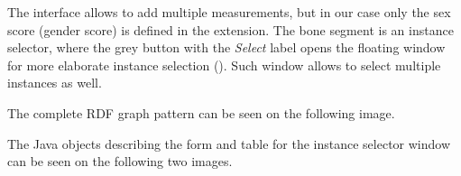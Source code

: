 
The interface allows to add multiple measurements, but in our case only the sex score (gender score) is defined in the extension. The bone segment is an instance selector, where the grey button with the \textit{Select} label opens the floating window for more elaborate instance selection (). Such window allows to select multiple instances as well.


The complete RDF graph pattern can be seen on the following image. 


The Java objects describing the form and table for the instance selector window can be seen on the following two images.



